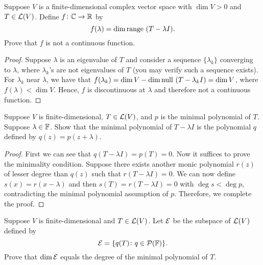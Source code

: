 \documentclass{extarticle}
\begin{document}
\begin{problem}{15}
    Suppose \(V\) is a finite-dimensional complex vector space with \(\dim V > 0\) and \(T \in \mathcal{L}(V)\). 
    Define \(f \colon \mathbb{C} \to \mathbb{R}\) by 
    \[f(\lambda) = \dim \text{range }(T - \lambda I).\]
    Prove that \(f\) is not a continuous function. 
\end{problem}

\begin{proof}
Suppose \(\lambda\) is an eigenvalue of \(T\) and consider a sequence \(\{\lambda_k\}\) converging to \(\lambda\), 
where \(\lambda_k\)'s are not eigenvalues of \(T\) (you may verify such a sequence exists). For \(\lambda_k\) near \(\lambda\), we have that 
\(f(\lambda_k) = \dim V - \dim \text{null } (T - \lambda_k I) = \dim V\), where \(f(\lambda) < \dim V\). Hence, \(f\) 
is discontinuous at \(\lambda\) and therefore not a continuous function. 
\end{proof}

\begin{problem}{17}
    Suppose \(V\) is finite-dimensional, \(T \in \mathcal{L}(V)\), and \(p\) is the minimal polynomial of \(T\). 
    Suppose \(\lambda \in \mathbb{F}\). Show that the minimal polynomial of \(T - \lambda I\) is the polynomial 
    \(q\) defined by \(q(z) = p(z + \lambda)\). 
\end{problem}

\begin{proof}
First we can see that \(q(T - \lambda I) = p(T) = 0\). Now it suffices to prove the minimality condition. 
Suppose there exists another monic polynomial \(r(z)\) of lesser degree than \(q(z)\) such that 
\(r(T - \lambda I) = 0\). We can now define \(s(x) = r(x - \lambda)\) and then 
\(s(T) = r(T - \lambda I) = 0\) with \(\deg s < \deg p\), contradicting the minimal polynomial assumption 
of \(p\). Therefore, we complete the proof. 
\end{proof}

\begin{problem}{19}
    Suppose \(V\) is finite-dimensional and \(T \in \mathcal{L}(V)\). Let \(\mathcal{E}\) be the subspace of 
    \(\mathcal{L}(V)\) defined by 
    \[\mathcal{E} = \{q(T) \colon q \in \mathcal{P}(\mathbb{F})\}.\]
    Prove that \(\dim \mathcal{E}\) equals the degree of the minimal polynomial of \(T\).
\end{problem}
\end{document}
